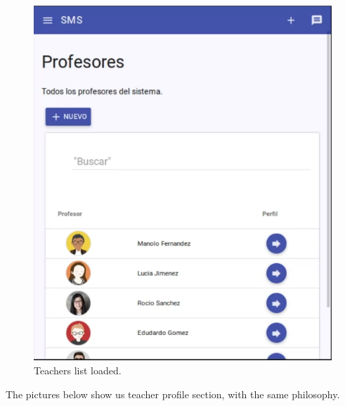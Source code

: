 \begin{figure}[H]
\begin{minipage}{.5\textwidth}
  \includegraphics[scale=0.3]{img/snaps/teachers_list.png}
  \caption{Teachers list loaded.}
\end{minipage}
\end{figure}

\noindent The pictures below show us teacher profile section, with
the same philosophy.

